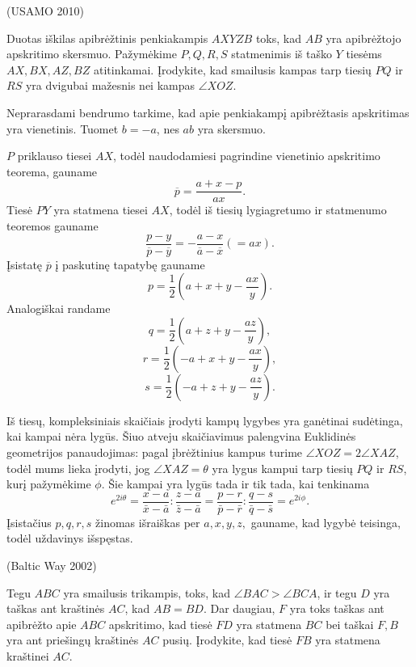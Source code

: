 \documentclass[11pt,a4paper,twoside]{book}
\begin{document}
\begin{pavnr}
(USAMO 2010) 

Duotas iškilas apibrėžtinis penkiakampis $AXYZB$ toks, kad $AB$ yra apibrėžtojo apskritimo skersmuo. Pažymėkime $P, Q, R, S$ statmenimis iš taško $Y$ tiesėms  $AX, BX, AZ, BZ$ atitinkamai. Įrodykite, kad smailusis kampas tarp tiesių $PQ$ ir $RS$ yra dvigubai mažesnis nei kampas $\angle XOZ$.
\end{pavnr}
\begin{sprendimas}
  Neprarasdami bendrumo tarkime, kad apie penkiakampį apibrėžtasis apskritimas yra vienetinis. Tuomet $b = -a$, nes $ab$ yra skersmuo. 

$P$ priklauso tiesei $AX$, todėl naudodamiesi pagrindine vienetinio apskritimo teorema, gauname $$\overline{p}=\frac{a+x-p}{ax}.$$ Tiesė $PY$ yra statmena tiesei $AX$, todėl iš tiesių lygiagretumo ir statmenumo teoremos gauname $$\frac{p-y}{\overline{p}-\overline{y}}=-\frac{a-x}{\overline{a}-\overline{x}} (=ax).$$ 
Įsistatę $\overline{p}$ į paskutinę tapatybę gauname 
$$p = \frac {1}{2}( a+x+y- \frac {ax}{y}).$$
Analogiškai randame
$$q = \frac {1}{2}( a+z+y- \frac {az}{y}),$$ 
$$r = \frac {1}{2}( -a+x+y- \frac {ax}{y}),$$
$$s = \frac {1}{2}( -a+z+y- \frac {az}{y}).$$

Iš tiesų, kompleksiniais skaičiais įrodyti kampų lygybes yra ganėtinai sudėtinga, kai kampai nėra lygūs. Šiuo atveju skaičiavimus palengvina Euklidinės geometrijos panaudojimas: pagal įbrėžtinius kampus turime $\angle XOZ = 2\angle XAZ$, todėl mums lieka įrodyti, jog  $\angle XAZ=\theta$ yra lygus kampui tarp tiesių $PQ$ ir $RS$, kurį pažymėkime $\phi$. Šie kampai yra lygūs tada ir tik tada, kai tenkinama 
$$e^{2i\theta}=\frac {x-a} {\bar x - \bar a} : \frac{z-a}{\bar z - \bar a} = \frac{p-r}{\bar p - \bar r} : \frac{q-s}{\bar q - \bar s}=e^{2i\phi}.$$
Įsistačius $p, q, r, s$ žinomas išraiškas per $a, x, y, z,$ gauname, kad lygybė teisinga, todėl uždavinys išspęstas.
\end{sprendimas}
     



\begin{pavnr}
(Baltic Way 2002) 

Tegu $ABC$ yra smailusis trikampis, toks, kad $ \angle BAC > \angle BCA$, ir tegu $D$ yra taškas ant kraštinės $AC$, kad $AB = BD$. Dar daugiau, $F$ yra toks taškas ant apibrėžto apie $ABC$ apskritimo, kad tiesė $FD$ yra statmena $BC$ bei taškai $F, B$ yra ant priešingų kraštinės $AC$ pusių. Įrodykite, kad tiesė $FB$ yra statmena kraštinei $AC$.
\end{pavnr}
\end{document}
